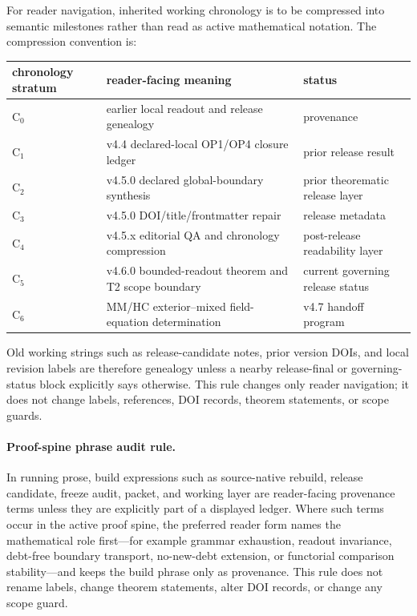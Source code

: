 For reader navigation, inherited working chronology is to be compressed into semantic milestones rather than read as active mathematical notation.  The compression convention is:
\begin{center}
\small
\begin{tabular}{@{}p{}p{}p{}@{}}
\toprule
chronology stratum & reader-facing meaning & status\\
\midrule
$\mathrm{C}_0$ & earlier local readout and release genealogy & provenance\\
$\mathrm{C}_1$ & v4.4 declared-local OP1/OP4 closure ledger & prior release result\\
$\mathrm{C}_2$ & v4.5.0 declared global-boundary synthesis & prior theorematic release layer\\
$\mathrm{C}_3$ & v4.5.0 DOI/title/frontmatter repair & release metadata\\
$\mathrm{C}_4$ & v4.5.x editorial QA and chronology compression & post-release readability layer\\
$\mathrm{C}_5$ & v4.6.0 bounded-readout theorem and T2 scope boundary & current governing release status\\
$\mathrm{C}_6$ & MM/HC exterior--mixed field-equation determination & v4.7 handoff program\\
\bottomrule
\end{tabular}
\end{center}
Old working strings such as release-candidate notes, prior version DOIs, and local revision labels are therefore genealogy unless a nearby release-final or governing-status block explicitly says otherwise.  This rule changes only reader navigation; it does not change labels, references, DOI records, theorem statements, or scope guards.

\paragraph{Proof-spine phrase audit rule.}
In running prose, build expressions such as source-native rebuild, release candidate, freeze audit, packet, and working layer are reader-facing provenance terms unless they are explicitly part of a displayed ledger.  Where such terms occur in the active proof spine, the preferred reader form names the mathematical role first---for example grammar exhaustion, readout invariance, debt-free boundary transport, no-new-debt extension, or functorial comparison stability---and keeps the build phrase only as provenance.  This rule does not rename labels, change theorem statements, alter DOI records, or change any scope guard.

